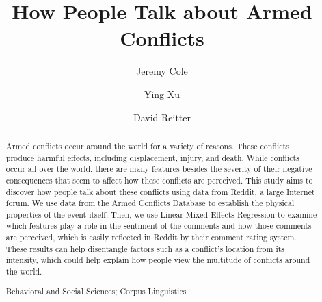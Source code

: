 \documentclass[runningheads,a4paper]{llncs}
\newcommand{\keywords}[1]{\par\addvspace\baselineskip
\noindent\keywordname\enspace\ignorespaces#1}
\begin{document}
\mainmatter  %

\title{How People Talk about Armed Conflicts}


%
%
\author{Jeremy Cole
\and Ying Xu\and David Reitter}
%


%
%

\maketitle


\begin{abstract}
Armed conflicts occur around the world for a variety of reasons. These conflicts produce harmful effects, including displacement, injury, and death. While conflicts occur all over the world, there are many features besides the severity of their negative consequences that seem to affect how these conflicts are perceived. This study aims to discover how people talk about these conflicts using data from Reddit, a large Internet forum. We use data from the Armed Conflicts Database to establish the physical properties of the event itself. Then, we use Linear Mixed Effects Regression to examine which features play a role in the sentiment of the comments and how those comments are perceived, which is easily reflected in Reddit by their comment rating system. These results can help disentangle factors such as a conflict’s location from its intensity, which could help explain how people view the multitude of conflicts around the world.
\keywords{Behavioral and Social Sciences; Corpus Linguistics}
\end{abstract}













\end{document}
